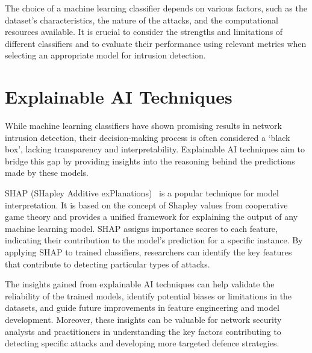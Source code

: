 The choice of a machine learning classifier depends on various factors, such as the dataset's characteristics, the nature of the attacks, and the computational resources available. It is crucial to consider the strengths and limitations of different classifiers and to evaluate their performance using relevant metrics when selecting an appropriate model for intrusion detection.

\section{Explainable AI Techniques}\label{sec:explainable}

While machine learning classifiers have shown promising results in network intrusion detection, their decision-making process is often considered a `black box', lacking transparency and interpretability. Explainable AI techniques aim to bridge this gap by providing insights into the reasoning behind the predictions made by these models.

SHAP (SHapley Additive exPlanations)~\cite{lundberg2017unified} is a popular technique for model interpretation. It is based on the concept of Shapley values from cooperative game theory and provides a unified framework for explaining the output of any machine learning model. SHAP assigns importance scores to each feature, indicating their contribution to the model's prediction for a specific instance. By applying SHAP to trained classifiers, researchers can identify the key features that contribute to detecting particular types of attacks.

The insights gained from explainable AI techniques can help validate the reliability of the trained models, identify potential biases or limitations in the datasets, and guide future improvements in feature engineering and model development. Moreover, these insights can be valuable for network security analysts and practitioners in understanding the key factors contributing to detecting specific attacks and developing more targeted defence strategies.
